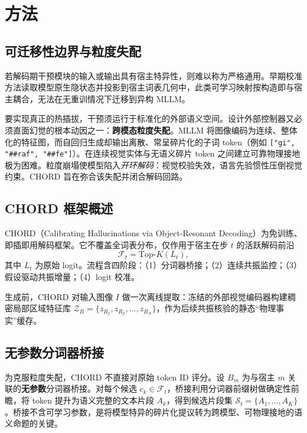 \section{方法}
\label{sec:method}

\subsection{可迁移性边界与粒度失配}

若解码期干预模块的输入或输出具有宿主特异性，则难以称为严格通用。早期校准方法读取模型原生隐状态并投影到宿主词表几何中，此类可学习映射按构造即与宿主耦合，无法在无重训情况下迁移到异构 MLLM。

要实现真正的热插拔，干预须运行于标准化的外部语义空间。设计外部控制器又必须直面幻觉的根本动因之一：\textbf{跨模态粒度失配}。MLLM 将图像编码为连续、整体化的特征图，而自回归生成却输出离散、常呈碎片化的子词 token（例如 \texttt{["gi", "\#\#raf", "\#\#fe"]}）。在连续视觉实体与无语义碎片 token 之间建立可靠物理接地极为困难。粒度崩塌使模型陷入\emph{开环解码}：视觉校验失效，语言先验惯性压倒视觉约束。CHORD 旨在弥合该失配并闭合解码回路。

\subsection{CHORD 框架概述}

CHORD（Calibrating Hallucinations via Object-Resonant Decoding）为免训练、即插即用解码框架。它不覆盖全词表分布，仅作用于宿主在步 $t$ 的活跃解码前沿
\begin{equation}
  \mathcal{F}_t = \mathrm{Top}\text{-}K(L_t),
\end{equation}
其中 $L_t$ 为原始 logit。流程含四阶段：（1）分词器桥接；（2）连续共振监控；（3）假设驱动共振增量；（4）logit 校准。

生成前，CHORD 对输入图像 $I$ 做一次离线提取：冻结的外部视觉编码器构建稠密局部区域特征库 $\mathcal{Z}_R = \{z_{R_1}, z_{R_2}, \dots, z_{R_N}\}$，作为后续共振核验的静态``物理事实''缓存。

\subsection{无参数分词器桥接}

为克服粒度失配，CHORD 不直接对原始 token ID 评分。设 $B_m$ 为与宿主 $m$ 关联的\textbf{无参数}分词器桥接。对每个候选 $c_k \in \mathcal{F}_t$，桥接利用分词器前缀树做确定性前瞻，将 token 提升为语义完整的文本片段 $A_k$，得到候选片段集 $\mathcal{S}_t = \{A_1,\dots,A_K\}$。桥接不含可学习参数，是将模型特异的碎片化提议转为跨模型、可物理接地的语义命题的关键。

